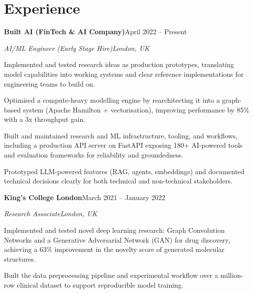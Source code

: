 \documentclass[10pt,a4paper]{article}
\newcommand{\entry}[4]{%
  {\color{company}\bfseries #1}\hfill {\color{muted}#2}\par
  \vspace{1pt}
  {\itshape #3}\hfill {\color{muted}\itshape #4}\par
  \vspace{3pt}%
}
\begin{document}
\section{Experience}
\entry{Built AI (FinTech \& AI Company)}{April 2022 -- Present}{AI/ML Engineer (Early Stage Hire)}{London, UK}
\begin{tight}
  \item Implemented and tested research ideas as production prototypes, translating model capabilities into working systems and clear reference implementations for engineering teams to build on.
  \item Optimised a compute-heavy modelling engine by rearchitecting it into a graph-based system (Apache Hamilton + vectorisation), improving performance by 85\% with a 3x throughput gain.
  \item Built and maintained research and ML infrastructure, tooling, and workflows, including a production API server on FastAPI exposing 180+ AI-powered tools and evaluation frameworks for reliability and groundedness.
  \item Prototyped LLM-powered features (RAG, agents, embeddings) and documented technical decisions clearly for both technical and non-technical stakeholders.
\end{tight}

\entry{King's College London}{March 2021 -- January 2022}{Research Associate}{London, UK}
\begin{tight}
  \item Implemented and tested novel deep learning research: Graph Convolution Networks and a Generative Adversarial Network (GAN) for drug discovery, achieving a 63\% improvement in the novelty score of generated molecular structures.
  \item Built the data preprocessing pipeline and experimental workflow over a million-row clinical dataset to support reproducible model training.
\end{tight}

\end{document}
